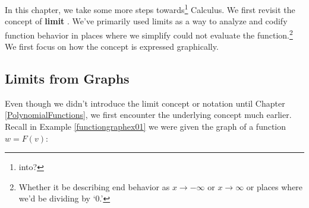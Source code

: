 \documentclass{ximera}
\begin{document}
	\author{Stitz-Zeager}




\setcounter{footnote}{0}

\label{IntroLimits}

In this chapter, we take some more steps towards\footnote{into?} Calculus.  We first revisit the  concept of \textbf{limit} .  We've primarily used limits as a way to analyze and codify function behavior in places where we simplify could not evaluate the function.\footnote{Whether it be describing end behavior as $x \rightarrow  - \infty$  or $x \rightarrow  \infty$ or places where we'd be dividing by `$0$.'}  We first focus on how the concept is expressed graphically.

\subsection{Limits from Graphs}
\label{limitsfromgraphs}

Even though we didn't introduce the limit concept or notation until Chapter \ref{PolynomialFunctions}, we first encounter the underlying concept much earlier.  Recall in  Example \ref{functiongraphex01} we were given the graph of a function $w = F(v)$:
\end{document}
